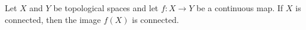 \begin{theorem}
Let $X$ and $Y$ be topological spaces and let $f \colon X \to Y$ be a continuous map. If $X$ is connected, then the image $f(X)$ is connected.
\end{theorem}
